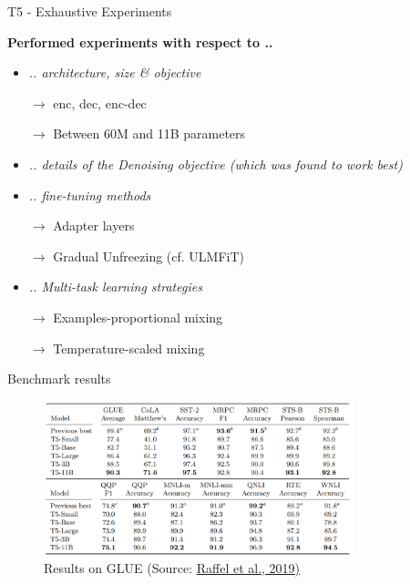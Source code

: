 \begin{frame}{T5 - Exhaustive Experiments}

\vfill

	\textbf{Performed experiments with respect to ..}
	
	\begin{itemize}
		\item \textit{.. architecture, size \& objective}
		\item[$\to$] enc, dec, enc-dec
		\item[$\to$] Between 60M and 11B parameters
		\item \textit{.. details of the Denoising objective (which was found to work best)}
		\item \textit{.. fine-tuning methods}
		\item[$\to$] Adapter layers
		\item[$\to$] Gradual Unfreezing (cf. ULMFiT)
		\item \textit{.. Multi-task learning strategies}
		\item[$\to$] Examples-proportional mixing
		\item[$\to$] Temperature-scaled mixing
	\end{itemize}
	
\vfill

\end{frame}


\begin{frame}{Benchmark results}

\vfill

	\begin{figure}
		\centering
		\includegraphics[width = 9cm]{figure/t5-glue.png}\\ 
		\footnotesize{Results on GLUE (Source:} \href{https://arxiv.org/pdf/1910.10683.pdf}{\footnotesize Raffel et al., 2019)}
	\end{figure}
	
\vfill

\end{frame}

